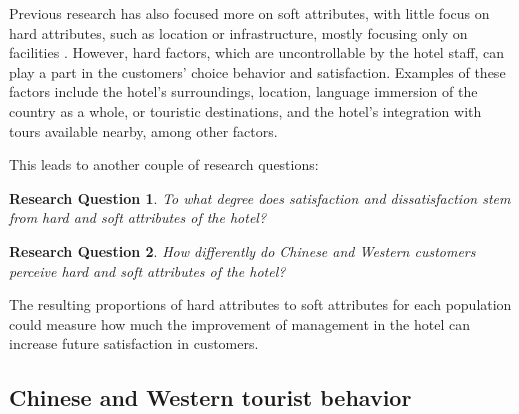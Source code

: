 \documentclass[smallextended,natbib]{svjour3}       %
\makeatletter
\newtheorem{rsq}{Research Question}
\newcounter{subrsq}
\newenvironment{subrsq}
         {%
          \setcounter{subrsq}{0}%
          \stepcounter{rsq}%
          \edef\saved@rsq{\thersq}%
          \let\c@rsq\c@subrsq     %
          \renewcommand{\thersq}{\saved@rsq\alph{rsq}}%
         }
         {}
\makeatother
\begin{document}
    Previous research has also focused more on soft attributes, with little focus on hard attributes, such as location or infrastructure, mostly focusing only on facilities \cite[e.g.][]{shanka2004, choi2001}. However, hard factors, which are uncontrollable by the hotel staff, can play a part in the customers' choice behavior and satisfaction. Examples of these factors include the hotel's surroundings, location, language immersion of the country as a whole, or touristic destinations, and the hotel's integration with tours available nearby, among other factors. 

    This leads to another couple of research questions:

    \begin{subrsq}
    \begin{rsq}
    \label{rsq:hard_soft}
    To what degree does satisfaction and dissatisfaction stem from hard and soft attributes of the hotel?
    \end{rsq}

    \begin{rsq}
    \label{rsq:hard_soft_diff}
    How differently do Chinese and Western customers perceive hard and soft attributes of the hotel?
    \end{rsq}
    \end{subrsq}

    The resulting proportions of hard attributes to soft attributes for each population could measure how much the improvement of management in the hotel can increase future satisfaction in customers. 

  \subsection{Chinese and Western tourist behavior}\label{theory_zh_en}
\end{document}
